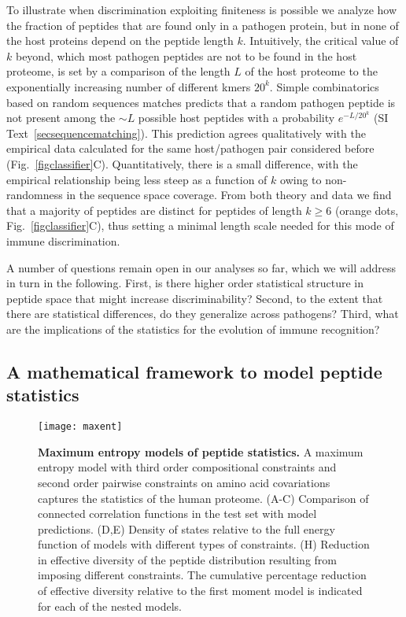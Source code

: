 \documentclass[superscriptaddress,twocolumn,pre]{revtex4}
\newcommand{\<}{\langle}
\renewcommand{\>}{\rangle}
\begin{document}
To illustrate when discrimination exploiting finiteness is possible we analyze how the fraction of peptides that are found only in a pathogen protein, but in none of the host proteins depend on the peptide length $k$. Intuitively, the critical value of $k$ beyond, which most pathogen peptides are not to be found in the host proteome, is set by a comparison of the length $L$ of the host proteome to the exponentially increasing number of different kmers $20^k$. Simple combinatorics based on random sequences matches predicts that a random pathogen peptide is not present among the $\sim L$ possible host peptides with a probability $e^{-L/20^k}$ (SI Text~\ref{secsequencematching}). This prediction agrees qualitatively with the empirical data calculated for the same host/pathogen pair considered before (Fig.~\ref{figclassifier}C). Quantitatively, there is a small difference, with the empirical relationship being less steep as a function of $k$ owing to non-randomness in the sequence space coverage. From both theory and data we find that a majority of peptides are distinct for peptides of length $k\geq6$ (orange dots, Fig.~\ref{figclassifier}C), thus setting a minimal length scale needed for this mode of immune discrimination.  



A number of questions remain open in our analyses so far, which we will address in turn in the following. First, is there higher order statistical structure in peptide space that might increase discriminability? Second, to the extent that there are statistical differences, do they generalize across pathogens? Third, what are the implications of the statistics for the evolution of immune recognition?


\subsection{A mathematical framework to model peptide statistics} 


\begin{figure*}
    \texttt{[image: maxent]}
        \caption{{\bf Maximum entropy models of peptide statistics.} A maximum entropy model with third order compositional constraints and second order pairwise constraints on amino acid covariations captures the statistics of the human proteome. (A-C) Comparison of connected correlation functions in the test set with model predictions. (D,E) Density of states relative to the full energy function of models with different types of constraints. (H) Reduction in effective diversity of the peptide distribution resulting from imposing different constraints. The cumulative percentage reduction of effective diversity relative to the first moment model is indicated for each of the nested models.
    \label{figmaxent}
    }
\end{figure*}
\end{document}
